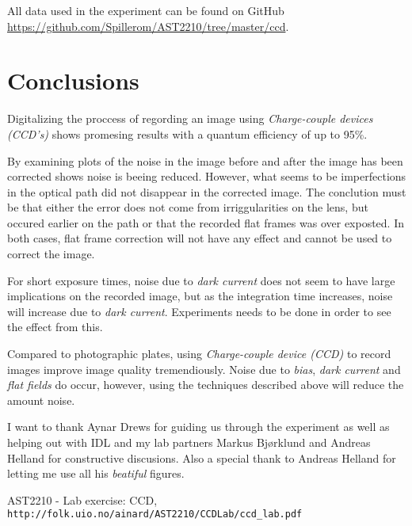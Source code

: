 \documentclass{emulateapj}
\begin{document}
All data used in the experiment can be found on GitHub \url{https://github.com/Spillerom/AST2210/tree/master/ccd}.

\section{Conclusions}
\label{sec:conclusions}

  Digitalizing the proccess of regording an image using \textit{Charge-couple devices (CCD's)} shows promesing results with a quantum efficiency of up to 95\%. 

  By examining plots of the noise in the image before and after the image has been corrected shows noise is beeing reduced. However, what seems to be imperfections in the optical path did not disappear in the corrected image. The conclution must be that either the error does not come from irriggularities on the lens, but occured earlier on the path or that the recorded flat frames was over exposted. In both cases, flat frame correction will not have any effect and cannot be used to correct the image.

For short exposure times, noise due to \textit{dark current} does not seem to have large implications on the recorded image, but as the integration time increases, noise will increase due to \textit{dark current}. Experiments needs to be done in order to see the effect from this.

Compared to photographic plates, using \textit{Charge-couple device (CCD)} to record images improve image quality tremendiously. Noise due to \textit{bias}, \textit{dark current} and \textit{flat fields} do occur, however, using the techniques described above will reduce the amount noise.


\begin{acknowledgements}
  I want to thank Aynar Drews for guiding us through the experiment as well as helping out with IDL and my lab partners Markus Bjørklund and Andreas Helland for constructive discusions. Also a special thank to Andreas Helland for letting me use all his \textit{beatiful} figures.
\end{acknowledgements}

\begin{thebibliography}{}

AST2210 - Lab exercise: CCD,
\\\texttt{http://folk.uio.no/ainard/AST2210/CCDLab/ccd\_lab.pdf}



\end{thebibliography}
\end{document}
